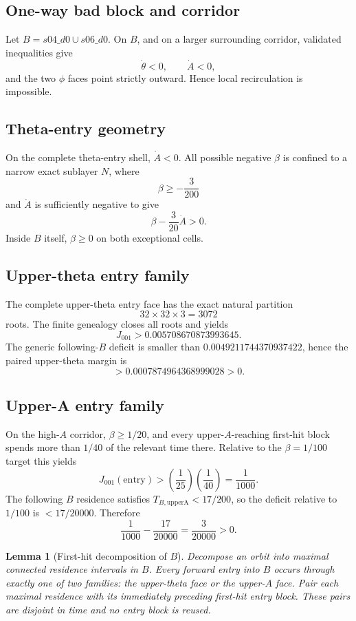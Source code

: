 \documentclass[11pt]{article}
\newtheorem{lemma}[theorem]{Lemma}
\begin{document}
\subsection{One-way bad block and corridor}
Let $B=s04\_d0\cup s06\_d0$. On $B$, and on a larger surrounding corridor, validated inequalities give
\[
\dot\theta<0,\qquad \dot A<0,
\]
and the two $\phi$ faces point strictly outward. Hence local recirculation is impossible.

\subsection{Theta-entry geometry}
On the complete theta-entry shell, $\dot A<0$. All possible negative $\beta$ is confined to a narrow exact sublayer $N$, where
\[
\beta\ge-\frac{3}{200}
\]
and $\dot A$ is sufficiently negative to give
\[
\beta-\frac{3}{20}\dot A>0.
\]
Inside $B$ itself, $\beta\ge0$ on both exceptional cells.

\subsection{Upper-theta entry family}
The complete upper-theta entry face has the exact natural partition
\[
32\times32\times3=3072
\]
roots. The finite genealogy closes all roots and yields
\[
J_{001}>0.005708670873993645.
\]
The generic following-$B$ deficit is smaller than $0.0049211744370937422$, hence the paired upper-theta margin is
\[
>0.0007874964368999028>0.
\]

\subsection{Upper-A entry family}
On the high-$A$ corridor, $\beta\ge1/20$, and every upper-$A$-reaching first-hit block spends more than $1/40$ of the relevant time there. Relative to the $\beta=1/100$ target this yields
\[
J_{001}(\mathrm{entry})>\left(\frac1{25}\right)\left(\frac1{40}\right)=\frac1{1000}.
\]
The following $B$ residence satisfies $T_{B,\mathrm{upperA}}<17/200$, so the deficit relative to $1/100$ is $<17/20000$. Therefore
\[
\frac1{1000}-\frac{17}{20000}=\frac3{20000}>0.
\]

\begin{lemma}[First-hit decomposition of $B$]\label{lem:first-hit}
Decompose an orbit into maximal connected residence intervals in $B$. Every forward entry into $B$ occurs through exactly one of two families: the upper-theta face or the upper-$A$ face. Pair each maximal residence with its immediately preceding first-hit entry block. These pairs are disjoint in time and no entry block is reused.
\end{lemma}
\end{document}
